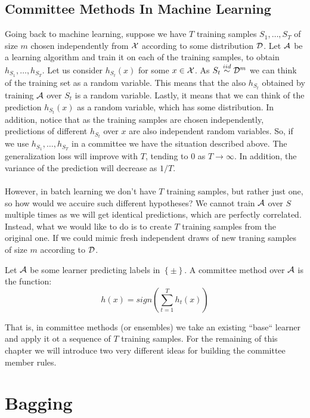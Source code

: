 \subsection{Committee Methods In Machine Learning}
Going back to machine learning, suppose we have $T$ training samples $S_1,\ldots,S_T$ of size $m$ chosen independently from $\mathcal{X}$ according to some distribution $\mathcal{D}$. Let $\mathcal{A}$ be a learning algorithm and train it on each of the training samples, to obtain $h_{S_1},\ldots,h_{S_T}$. Let us consider $h_{S_t}\left(x\right)$ for some $x\in\mathcal{X}$. As $S_t\overset{iid}{\sim}\mathcal{D}^m$ we can think of the training set as a random variable. This means that the also $h_{S_t}$ obtained by training $\mathcal{A}$ over $S_t$ is a random variable. Lastly, it means that we can think of the prediction $h_{S_t}\left(x\right)$ as a random variable, which has some distribution. In addition, notice that as the training samples are chosen independently, predictions of different $h_{S_t}$ over $x$ are also independent random variables. So, if we use $h_{S_1},\ldots,h_{S_T}$ in a committee we have the situation described above. The generalization loss will improve with $T$, tending to $0$ as $T\rightarrow\infty$. In addition, the variance of the prediction will decrease as $1/T$.
\\~\\
However, in batch learning we don't have $T$ training samples, but rather just one, so how would we accuire such different hypotheses? We cannot train $\mathcal{A}$ over $S$ multiple times as we will get identical predictions, which are perfectly correlated. Instead, what we would like to do is to create $T$ training samples from the original one. If we could mimic fresh independent draws of new traning samples of size $m$ according to $\mathcal{D}$.

\begin{definition}
Let $\mathcal{A}$ be some learner predicting labels in $\left\{\pm\right\}$. A committee method over $\mathcal{A}$ is the function: $$ h\left(x\right)=sign\left(\sum^{T}_{t=1}h_t\left(x\right)\right) $$
\end{definition}
That is, in committee methods (or ensembles) we take an existing ``base`` learner and apply it ot a sequence of $T$ training samples. For the remaining of this chapter we will introduce two very different ideas for building the committee member rules.


\section{Bagging}
